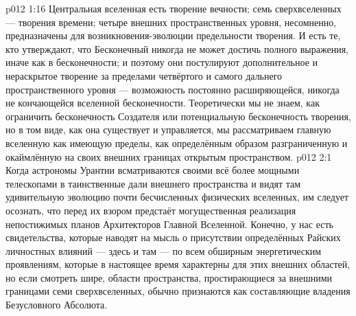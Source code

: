 \vs p012 1:16 Центральная вселенная есть творение вечности; семь сверхвселенных --- творения времени; четыре внешних пространственных уровня, несомненно, предназначены для возникновения\hyp{}эволюции предельности творения. И есть те, кто утверждают, что Бесконечный никогда не может достичь полного выражения, иначе как в бесконечности; и поэтому они постулируют дополнительное и нераскрытое творение за пределами четвёртого и самого дальнего пространственного уровня --- возможность постоянно расширяющейся, никогда не кончающейся вселенной бесконечности. Теоретически мы не знаем, как ограничить бесконечность Создателя или потенциальную бесконечность творения, но в том виде, как она существует и управляется, мы рассматриваем главную вселенную как имеющую пределы, как определённым образом разграниченную и окаймлённую на своих внешних границах открытым пространством.
\vs p012 2:1 Когда астрономы Урантии всматриваются своими всё более мощными телескопами в таинственные дали внешнего пространства и видят там удивительную эволюцию почти бесчисленных физических вселенных, им следует осознать, что перед их взором предстаёт могущественная реализация непостижимых планов Архитекторов Главной Вселенной. Конечно, у нас есть свидетельства, которые наводят на мысль о присутствии определённых Райских личностных влияний --- здесь и там --- по всем обширным энергетическим проявлениям, которые в настоящее время характерны для этих внешних областей, но если смотреть шире, области пространства, простирающиеся за внешними границами семи сверхвселенных, обычно признаются как составляющие владения Безусловного Абсолюта.
